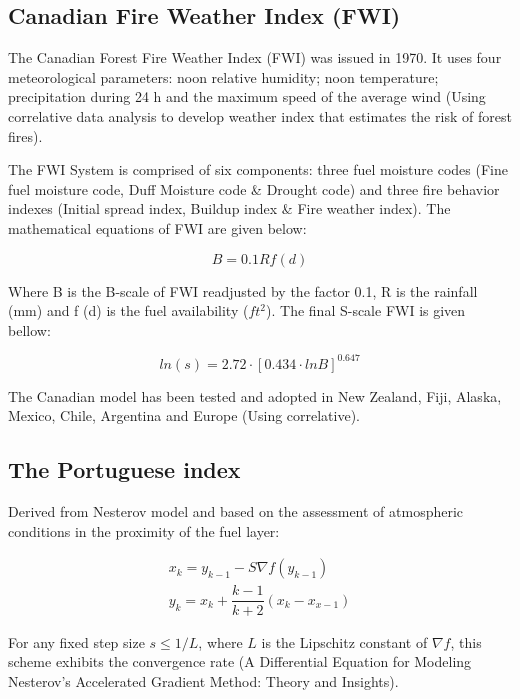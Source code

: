 {{{\subsection{Canadian Fire Weather Index (FWI)}
	The Canadian Forest Fire Weather Index (FWI) was issued in 1970. It uses four meteorological parameters: noon relative humidity; noon temperature; precipitation during 24 h and the maximum speed of the average wind (Using correlative data analysis to develop weather index that estimates the risk of forest fires).
	
	The FWI System is comprised of six components: three fuel moisture codes (Fine fuel moisture code, Duff Moisture code \& Drought code) and three fire behavior indexes (Initial spread index, Buildup index \& Fire weather index). The mathematical equations of FWI are given below:
	
	\begin{equation}
	B=0.1Rf(d)
	\end{equation}
	
	Where B is the B-scale of FWI readjusted by the factor 0.1, R is the rainfall (mm) and f (d) is the fuel availability ($ft^2$). The final
	S-scale FWI is given bellow:

	\begin{equation}
	ln(s)=2.72 \cdot [0.434 \cdot lnB]^{0.647}
	\end{equation}
	
	The Canadian model has been tested and adopted in New Zealand, Fiji, Alaska, Mexico, Chile, Argentina and Europe (Using correlative).
	
	\subsection{The Portuguese index}
		Derived from Nesterov model and based on the assessment of atmospheric conditions in the proximity of the fuel layer:
		
	\begin{equation}
		\begin{aligned}
			x_{k} = y_{k-1} - S\nabla f(y_{k-1})\\
			y_{k} = x_{k} + \dfrac{k-1}{k+2}(x_{k} - x_{x-1})
		\end{aligned}
	\end{equation}

	For any fixed step size $s \le 1/L$, where $L$ is the Lipschitz constant of $\nabla f$, this scheme exhibits the convergence rate (A Differential Equation for Modeling Nesterov’s Accelerated Gradient Method: Theory and Insights).
	
}}}
